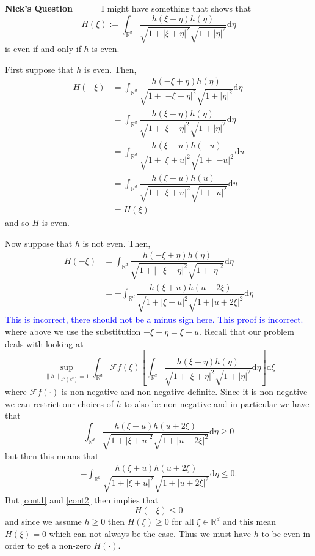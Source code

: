 \documentclass[a4paper,11pt]{article}
\numberwithin{equation}{section}
\theoremstyle{plain}
\theoremstyle{definition}
\newcommand{\ud}{\ensuremath{\mathrm{d}}}
\newcommand{\Norm}[1]{\left\|  #1   \right\|}
\newcommand{\R}{\mathbb{R}}
\newcounter{NQ}
\newenvironment{NickQuestion}[1][] %
{\refstepcounter{NQ}
	\begin{mdframed}[backgroundcolor=lightgray]\textbf{Nick's Question \theNQ \: #1~~}~~~\noindent}%
	{\end{mdframed}}
\numberwithin{NQ}{section}
\numberwithin{LQ}{section}
\numberwithin{ZQ}{section}
\begin{document}
\begin{NickQuestion}
	I might have something that shows that 
	\[
		H(\xi) := \int_{\R^d} \dfrac{h(\xi+\eta)h(\eta)}{\sqrt{1+|\xi + \eta|^2}\sqrt{1+|\eta|^2}} \ud \eta
	\]
	is even if and only if $h$ is even. 
	
	First suppose that $h$ is even. Then, 
	\begin{align*}
			H(-\xi) &= \int_{\R^d} \dfrac{h(-\xi+\eta)h(\eta)}{\sqrt{1+|-\xi + \eta|^2}\sqrt{1+|\eta|^2}} \ud \eta
			\\&= \int_{\R^d} \dfrac{h(\xi-\eta)h(\eta)}{\sqrt{1+|\xi - \eta|^2}\sqrt{1+|\eta|^2}} \ud \eta
			\\&= \int_{\R^d} \dfrac{h(\xi+u)h(-u)}{\sqrt{1+|\xi +u|^2}\sqrt{1+|-u|^2}} \ud u
			\\& = \int_{\R^d} \dfrac{h(\xi+u)h(u)}{\sqrt{1+|\xi +u|^2}\sqrt{1+|u|^2}} \ud u
			\\& = H(\xi)
	\end{align*}
and so $H$ is even. 

Now suppose that $h$ is not even. Then,
\begin{align}
		H(-\xi) &= \int_{\R^d} \dfrac{h(-\xi+\eta)h(\eta)}{\sqrt{1+|-\xi + \eta|^2}\sqrt{1+|\eta|^2}} \ud \eta \nonumber
		\\&= -\int_{\R^d} \dfrac{h(\xi+u)h(u+2\xi)}{\sqrt{1+|\xi + u|^2}\sqrt{1+|u+2\xi|^2}} \ud \eta \label{cont1}
\end{align}
\textcolor{blue}{This is incorrect, there should not be a minus sign here. This proof is incorrect.} 
where above we use the substitution $-\xi +\eta = \xi +u$. Recall that our problem deals with looking at 
\[
	\sup_{\Norm{h}_{L^2(\R^d)}=1} \int_{\R^d} \mathcal{F}{f}(\xi) \left[ \int_{\R^d} \dfrac{h(\xi+\eta)h(\eta)}{\sqrt{1+|\xi + \eta|^2}\sqrt{1+|\eta|^2}} \ud \eta \right] \ud \xi
\]
where $\mathcal{F}{f}(\cdot)$ is non-negative and non-negative definite. Since it is non-negative we can restrict our choices of $h$ to also be non-negative and in particular we have that 
\[
	\int_{\R^d} \dfrac{h(\xi+u)h(u+2\xi)}{\sqrt{1+|\xi + u|^2}\sqrt{1+|u+2\xi|^2}} \ud \eta \ge 0
\]
but then this means that 
\begin{align}
	-\int_{\R^d} \dfrac{h(\xi+u)h(u+2\xi)}{\sqrt{1+|\xi + u|^2}\sqrt{1+|u+2\xi|^2}} \ud \eta \le 0. \label{cont2}
\end{align}
But \eqref{cont1} and \eqref{cont2} then implies that 
\[ 
	H(-\xi) \le 0
\]
and since we assume $h \ge 0$ then $H(\xi) \ge 0$ for all $\xi \in \R^d$ and this mean $H(\xi)=0$ which can not always be the case. Thus we must have $h$ to be even in order to get a non-zero $H(\cdot)$. 
\end{NickQuestion}
\end{document}
